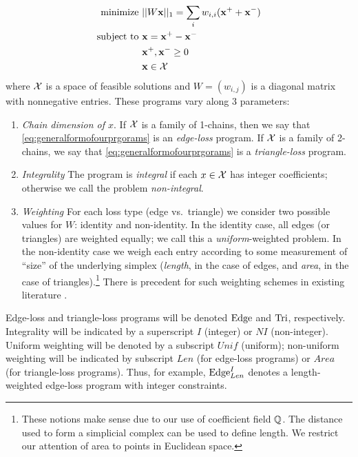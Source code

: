 \begin{align}
\begin{split}
    \text{minimize } & || W \mathbf{x}||_1 = \sum_i w_{i,i} (\mathbf{x}^+ + \mathbf{x}^-) \\
    \text{subject to } 
    & \mathbf{x} = \mathbf{x}^+ - \mathbf{x}^- \\
    & \mathbf{x}^+, \mathbf{x}^- \ge 0 \\
    & \mathbf{x} \in \mathcal{X}
\end{split}
\label{eq:generalformofourprgorams}
\end{align}
where $\mathcal{X}$ is a space of feasible solutions and $W = (w_{i,j})$ is a diagonal matrix with nonnegative entries.  These programs vary along 3 parameters:
    \begin{enumerate}
        \item \emph{Chain dimension of $x$}.  If $\mathcal{X}$ is a family of 1-chains, then we say that \eqref{eq:generalformofourprgorams} is an \emph{edge-loss} program.  If $\mathcal{X}$ is a family of 2-chains, we say that \eqref{eq:generalformofourprgorams} is a \emph{triangle-loss} program.
        
        \item \emph{Integrality}  The program is \emph{integral} if each $x \in \mathcal{X}$ has integer coefficients; otherwise we call the problem \emph{non-integral}.
        
        \item \emph{Weighting}  For each loss type (edge vs.\ triangle) we consider two possible values for $W$: identity and non-identity.  In the identity case, all edges (or triangles) are weighted equally; we call this a \emph{uniform}-weighted problem.  In the non-identity case we weigh each entry according to some measurement of ``size'' of the underlying simplex (\emph{length}, in the case of edges, and \emph{area}, in the case of triangles).\footnote{These notions make sense due to our use of coefficient field $\mathbb{Q}$. The distance used to form a simplicial complex can be used to define length. We restrict our attention of area to points in Euclidean space.}  There is precedent for such weighting schemes in existing literature \cite{dey2011optimal, chenquantifying}.
    \end{enumerate}

Edge-loss and triangle-loss programs will be denoted $\mathrm{Edge}$ and $\mathrm{Tri}$, respectively.  Integrality will be indicated by a superscript $I$ (integer) or $NI$ (non-integer).  Uniform weighting will be denoted by a subscript $Unif$ (uniform); non-uniform weighting will be indicated by subscript $Len$ (for edge-loss programs) or $Area$ (for triangle-loss programs).  Thus, for example, $\mathrm{Edge}^{I}_{Len}$ denotes a length-weighted edge-loss program with integer constraints.

